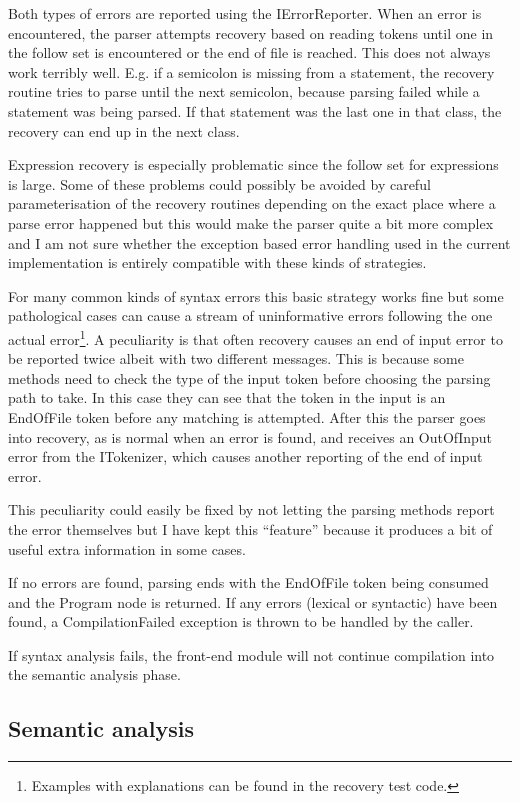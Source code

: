 \documentclass[a4paper,11pt]{article}
\begin{document}
Both types of errors are reported using the IErrorReporter. When an error is encountered, the parser attempts recovery based on reading tokens until one in the follow set is encountered or the end of file is reached. This does not always work terribly well. E.g. if a semicolon is missing from a statement, the recovery routine tries to parse until the next semicolon, because parsing failed while a statement was being parsed. If that statement was the last one in that class, the recovery can end up in the next class.

Expression recovery is especially problematic since the follow set for expressions is large. Some of these problems could possibly be avoided by careful parameterisation of the recovery routines depending on the exact place where a parse error happened but this would make the parser quite a bit more complex and I am not sure whether the exception based error handling used in the current implementation is entirely compatible with these kinds of strategies.

For many common kinds of syntax errors this basic strategy works fine but some pathological cases can cause a stream of uninformative errors following the one actual error\footnote{Examples with explanations can be found in the recovery test code.}. A peculiarity is that often recovery causes an end of input error to be reported twice albeit with two different messages. This is because some methods need to check the type of the input token before choosing the parsing path to take. In this case they can see that the token in the input is an EndOfFile token before any matching is attempted. After this the parser goes into recovery, as is normal when an error is found, and receives an OutOfInput error from the ITokenizer, which causes another reporting of the end of input error.

This peculiarity could easily be fixed by not letting the parsing methods report the error themselves but I have kept this ``feature'' because it produces a bit of useful extra information in some cases.

If no errors are found, parsing ends with the EndOfFile token being consumed and the Program node is returned. If any errors (lexical or syntactic) have been found, a CompilationFailed exception is thrown to be handled by the caller.

If syntax analysis fails, the front-end module will not continue compilation into the semantic analysis phase.

\subsection{Semantic analysis}
\end{document}
